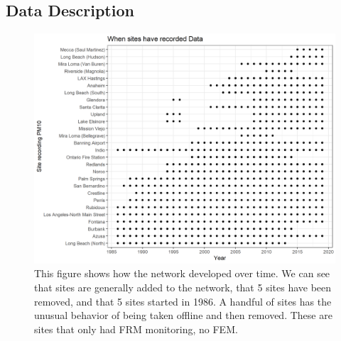 \documentclass{article}
\begin{document}
\subsection{Data Description}
\label{subsec:datadescripion}
\begin{figure}[ht]
    \centering
    \includegraphics[width = \textwidth]{Figures/site_dotplot-colour.png}
    \caption{This figure shows how the network developed over time.  We can see that sites are generally added to the network, that 5 sites have been removed, and that 5 sites started in 1986.  A handful of sites has the unusual behavior of being taken offline and then removed.  These are sites that only had \ac{FRM} monitoring, no \ac{FEM}.}
    \label{fig:site_dotplot}
\end{figure}
\end{document}

